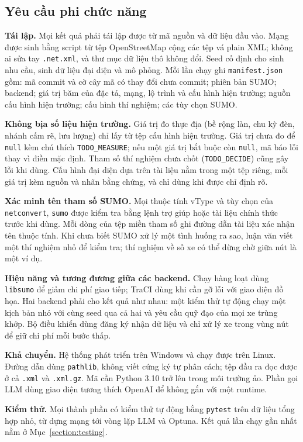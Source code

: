 \documentclass[../DoAn.tex]{subfiles}
\begin{document}
\subsection{Yêu cầu phi chức năng}
\label{subsection:2.2.3}

\textbf{Tái lập.} Mọi kết quả phải tái lập được từ mã nguồn và dữ liệu đầu vào. Mạng được sinh bằng script từ tệp OpenStreetMap cộng các tệp vá plain XML; không ai sửa tay \texttt{.net.xml}, và thư mục dữ liệu thô không đổi. Seed cố định cho sinh nhu cầu, sinh dữ liệu đại diện và mô phỏng. Mỗi lần chạy ghi \texttt{manifest.json} gồm: mã commit và cờ cây mã có thay đổi chưa commit; phiên bản SUMO; backend; giá trị băm của đặc tả, mạng, lộ trình và cấu hình hiện trường; nguồn cấu hình hiện trường; cấu hình thí nghiệm; các tùy chọn SUMO.

\textbf{Không bịa số liệu hiện trường.} Giá trị đo thực địa (bề rộng làn, chu kỳ đèn, nhánh cấm rẽ, lưu lượng) chỉ lấy từ tệp cấu hình hiện trường. Giá trị chưa đo để \texttt{null} kèm chú thích \texttt{TODO\_MEASURE}; nếu một giá trị bắt buộc còn \texttt{null}, mã báo lỗi thay vì điền mặc định. Tham số thí nghiệm chưa chốt (\texttt{TODO\_DECIDE}) cũng gây lỗi khi dùng. Cấu hình đại diện dựa trên tài liệu nằm trong một tệp riêng, mỗi giá trị kèm nguồn và nhãn bằng chứng, và chỉ dùng khi được chỉ định rõ.

\textbf{Xác minh tên tham số SUMO.} Mọi thuộc tính vType và tùy chọn của \texttt{netconvert}, \texttt{sumo} được kiểm tra bằng lệnh trợ giúp hoặc tài liệu chính thức trước khi dùng. Mỗi dòng của tệp miền tham số ghi đường dẫn tài liệu xác nhận tên thuộc tính. Khi chưa biết SUMO xử lý một tình huống ra sao, luận văn viết một thí nghiệm nhỏ để kiểm tra; thí nghiệm về số xe có thể dừng chờ giữa nút là một ví dụ.

\textbf{Hiệu năng và tương đương giữa các backend.} Chạy hàng loạt dùng \texttt{libsumo} để giảm chi phí giao tiếp; TraCI dùng khi cần gỡ lỗi với giao diện đồ họa. Hai backend phải cho kết quả như nhau: một kiểm thử tự động chạy một kịch bản nhỏ với cùng seed qua cả hai và yêu cầu quỹ đạo của mọi xe trùng khớp. Bộ điều khiển dùng đăng ký nhận dữ liệu và chỉ xử lý xe trong vùng nút để giữ chi phí mỗi bước thấp.

\textbf{Khả chuyển.} Hệ thống phát triển trên Windows và chạy được trên Linux. Đường dẫn dùng \texttt{pathlib}, không viết cứng ký tự phân cách; tệp đầu ra đọc được ở cả \texttt{.xml} và \texttt{.xml.gz}. Mã cần Python 3.10 trở lên trong môi trường ảo. Phần gọi LLM dùng giao diện tương thích OpenAI để không gắn với một runtime.

\textbf{Kiểm thử.} Mọi thành phần có kiểm thử tự động bằng \texttt{pytest} trên dữ liệu tổng hợp nhỏ, từ dựng mạng tới vòng lặp LLM và Optuna. Kết quả lần chạy gần nhất nằm ở Mục~\ref{section:testing}.
\end{document}
